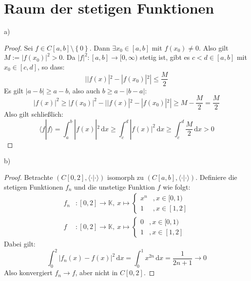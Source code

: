 \documentclass[a4paper,12pt]{article}
\newcommand{\brak}{}
\newcommand{\intx}{}
\newcommand{\klam}{}
\newcommand{\klammer}{}
\begin{document}
\section{Raum der stetigen Funktionen}
a)
\begin{proof}
Sei $f\in C\klam\left[ {a,b} \right]\setminus\klammer\left\{ {0} \right\}$. Dann $\exists x_0\in\klam\left[ {a,b} \right]$ mit $f(x_0)\neq 0$. Also gilt $M:=|f(x_0)|^2>0$. Da $|f|^2:\klam\left[ {a,b} \right]\rightarrow[0,\infty)$ stetig ist, gibt es $c<d\in [a,b]$ mit $x_0\in[c,d]$, so dass:
$$||f(x)|^2-|f(x_0)|^2|\le \frac{M}{2}$$
Es gilt $|a-b|\ge a-b$, also auch $b\ge a-|b-a|$:
$$|f(x)|^2\ge|f(x_0)|^2-||f(x)|^2-|f(x_0)|^2|\ge M-\frac{M}{2}=\frac{M}{2}$$
Also gilt schließlich:
$$\brak\langle {f}| {f}\rangle=\intx\int_{a}^{b}|f(x)|^2\,\mathrm{d}x\ge\intx\int_{c}^{d}|f(x)|^2\,\mathrm{d}x\ge\intx\int_{c}^{d}\frac{M}{2}\,\mathrm{d}x>0$$ 
\end{proof}
b)
\begin{proof}
Betrachte $(C[0,2],\brak\langle {\cdot}| {\cdot}\rangle)$ isomorph zu $(C[a,b],\brak\langle {\cdot }| {\cdot }\rangle)$. Definiere die stetigen Funktionen $f_n$ und die unstetige Funktion $f$ wie folgt:
\begin{align*}
f_n&:[0,2]\rightarrow\mathbb{K},\ x\mapsto\left\{\begin{matrix}
x^n &, x\in[0,1)\\
1 &, x\in [1,2]
\end{matrix}\right.\\
f&:[0,2]\rightarrow\mathbb{K},\ x\mapsto\left\{\begin{matrix}
0 &, x\in[0,1)\\
1 &, x\in [1,2]
\end{matrix}\right.
\end{align*}
Dabei gilt:
$$\intx\int_{0}^{2}|f_n(x)-f(x)|^2\,\mathrm{d}x=\intx\int_{0}^{1}x^{2n}\,\mathrm{d}x=\frac{1}{2n+1}\rightarrow 0$$
Also konvergiert $f_n\rightarrow f$, aber nicht in $C[0,2]$.
\end{proof}
\end{document}
